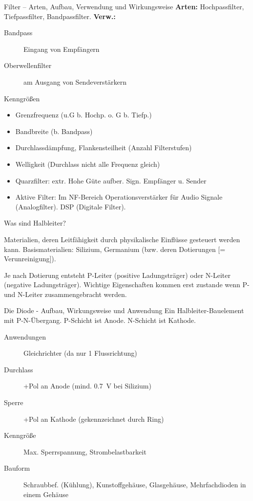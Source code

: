 \documentclass[avery5371,grid,frame,a4paper]{flashcards}
\newcommand{\card}[3]{
  \begin{flashcard}[{\chap} -- #1]{#2}#3\end{flashcard}
}
\begin{document}
\card{21}{Filter – Arten, Aufbau, Verwendung und Wirkungsweise}{
  \footnotesize
  \textbf{Arten:} Hochpassfilter, Tiefpassfilter, Bandpassfilter.
  \textbf{Verw.:}

  \begin{description}
    \item[Bandpass] Eingang von Empfängern
    \item[Oberwellenfilter] am Ausgang von Sendeverstärkern
    \item[Kenngrößen]
  \end{description}
  {
    \scriptsize
      \begin{minipage}{0.5\textwidth}
        \begin{itemize}
          \item Grenzfrequenz (u.G b. Hochp. o. G b. Tiefp.)  %
          \item Bandbreite (b. Bandpass)
          \item Durchlassdämpfung, Flankensteilheit (Anzahl Filterstufen)
          \item Welligkeit (Durchlass nicht alle Frequenz gleich)
        \end{itemize}
      \end{minipage}
      \begin{minipage}{0.47\textwidth}
        \begin{itemize}
          \item Quarzfilter: extr. Hohe Güte aufber. Sign. Empfänger u. Sender
          \item Aktive Filter: Im NF-Bereich Operationsverstärker für Audio Signale (Analogfilter).
            DSP (Digitale Filter).
        \end{itemize}
      \end{minipage}
  }
}
\card{22}{Was sind Halbleiter?}{
  \item
  Materialien, deren Leitfähigkeit durch physikalische Einflüsse gesteuert werden kann.
  Basismaterialien: Silizium, Germanium (bzw. deren Dotierungen [= Verunreinigung]).

  \item
  Je nach Dotierung entsteht P-Leiter (positive Ladungsträger) oder N-Leiter (negative Ladungsträger).
  Wichtige Eigenschaften kommen erst zustande  wenn P- und N-Leiter zusammengebracht werden.
}
\card{23}{Die Diode - Aufbau, Wirkungsweise und Anwendung}{
  \small
  Ein Halbleiter-Bauelement mit P-N-Übergang.
  P-Schicht ist Anode. N-Schicht ist Kathode.
  \begin{description}
    \item[Anwendungen] Gleichrichter (da nur 1 Flussrichtung)
    \item[Durchlass] +Pol an Anode (mind. \SI{0,7}{\volt} bei Silizium)
    \item[Sperre] +Pol an Kathode (gekennzeichnet durch Ring)
    \item[Kenngröße] Max. Sperrspannung, Strombelastbarkeit
    \item[Bauform] Schraubbef. (Kühlung), Kunstoffgehäuse, Glasgehäuse, Mehrfachdioden in einem Gehäuse
  \end{description}
}
\end{document}
